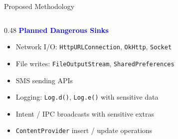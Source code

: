 \documentclass[aspectratio=169]{beamer}
\begin{document}
\begin{frame}{Proposed Methodology}
\begin{columns}[T]
    \begin{column}{0.48\textwidth}
        \textbf{\textcolor{blue}{Planned Dangerous Sinks}}
        \begin{itemize}\footnotesize
            \item Network I/O: \texttt{HttpURLConnection}, \texttt{OkHttp},
                  \texttt{Socket}
            \item File writes: \texttt{FileOutputStream},
                  \texttt{SharedPreferences}
            \item SMS sending APIs
            \item Logging: \texttt{Log.d()}, \texttt{Log.e()} with sensitive data
            \item Intent / IPC broadcasts with sensitive extras
            \item \texttt{ContentProvider} insert / update operations
        \end{itemize}
    \end{column}
\end{columns}
\end{frame}
\end{document}
